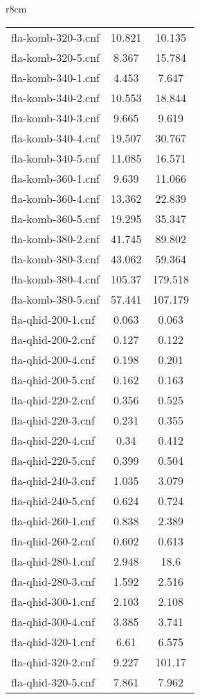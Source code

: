 \begin{wraptable}[30]{r}{8cm}
\begin{tabular}{l| c c }
fla-komb-320-3.cnf & 10.821 & 10.135 \\
fla-komb-320-5.cnf & 8.367 & 15.784 \\
fla-komb-340-1.cnf & 4.453 & 7.647 \\
fla-komb-340-2.cnf & 10.553 & 18.844 \\
fla-komb-340-3.cnf & 9.665 & 9.619 \\
fla-komb-340-4.cnf & 19.507 & 30.767 \\
fla-komb-340-5.cnf & 11.085 & 16.571 \\
fla-komb-360-1.cnf & 9.639 & 11.066 \\
fla-komb-360-4.cnf & 13.362 & 22.839 \\
fla-komb-360-5.cnf & 19.295 & 35.347 \\
fla-komb-380-2.cnf & 41.745 & 89.802 \\
fla-komb-380-3.cnf & 43.062 & 59.364 \\
fla-komb-380-4.cnf & 105.37 & 179.518 \\
fla-komb-380-5.cnf & 57.441 & 107.179 \\
fla-qhid-200-1.cnf & 0.063 & 0.063 \\
fla-qhid-200-2.cnf & 0.127 & 0.122 \\
fla-qhid-200-4.cnf & 0.198 & 0.201 \\
fla-qhid-200-5.cnf & 0.162 & 0.163 \\
fla-qhid-220-2.cnf & 0.356 & 0.525 \\
fla-qhid-220-3.cnf & 0.231 & 0.355 \\
fla-qhid-220-4.cnf & 0.34 & 0.412 \\
fla-qhid-220-5.cnf & 0.399 & 0.504 \\
fla-qhid-240-3.cnf & 1.035 & 3.079 \\
fla-qhid-240-5.cnf & 0.624 & 0.724 \\
fla-qhid-260-1.cnf & 0.838 & 2.389 \\
fla-qhid-260-2.cnf & 0.602 & 0.613 \\
fla-qhid-280-1.cnf & 2.948 & 18.6 \\
fla-qhid-280-3.cnf & 1.592 & 2.516 \\
fla-qhid-300-1.cnf & 2.103 & 2.108 \\
fla-qhid-300-4.cnf & 3.385 & 3.741 \\
\fi
fla-qhid-320-1.cnf & 6.61 & 6.575 \\
fla-qhid-320-2.cnf & 9.227 & 101.17 \\
fla-qhid-320-5.cnf & 7.861 & 7.962 \\

\end{tabular}
\end{wraptable}
